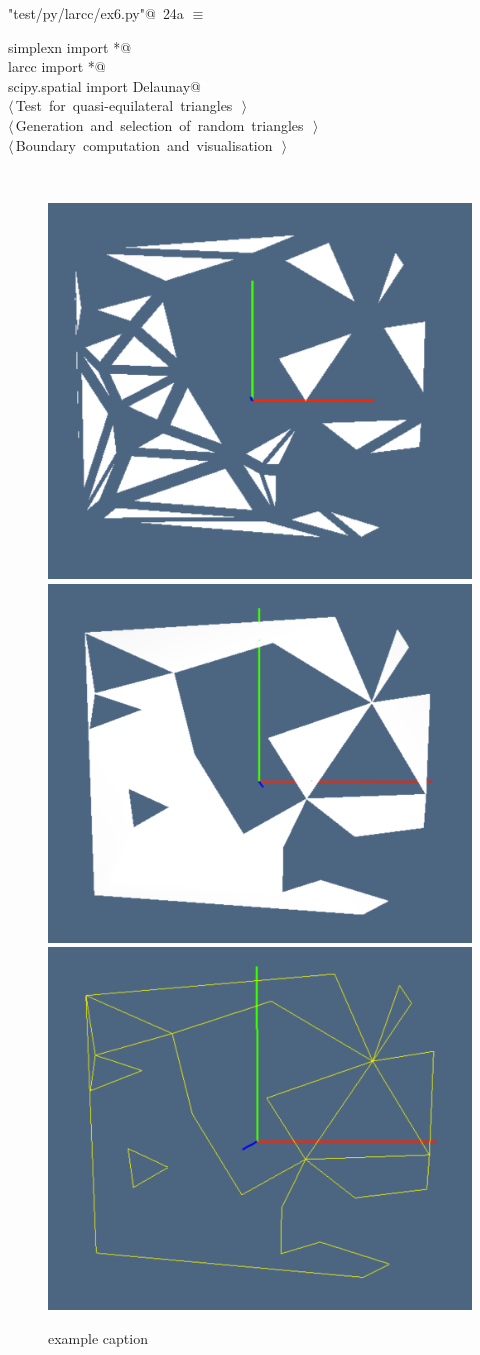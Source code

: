 \documentclass[11pt,oneside]{article}	%
\begin{document}
\begin{flushleft} \small
\begin{minipage}{\linewidth} \label{scrap59}
\protect{}\verb@"test/py/larcc/ex6.py"@\nobreak\ {\footnotesize 24a }$\equiv$
\vspace{-1ex}
\begin{list}{}{} \item
\mbox{}\verb@from simplexn import *@\\
\mbox{}\verb@from larcc import *@\\
\mbox{}\verb@from scipy.spatial import Delaunay@\\
\mbox{}\verb@@\hbox{$\langle\,$Test for quasi-equilateral triangles\nobreak\ {\footnotesize {}}$\,\rangle$}\verb@@\\
\mbox{}\verb@@\hbox{$\langle\,$Generation and selection of random triangles\nobreak\ {\footnotesize {}}$\,\rangle$}\verb@@\\
\mbox{}\verb@@\hbox{$\langle\,$Boundary computation and visualisation\nobreak\ {\footnotesize {}}$\,\rangle$}\verb@@\\
\mbox{}\verb@@{\NWsep}
\end{list}
\vspace{-2ex}
\end{minipage}\\[4ex]
\end{flushleft}


\begin{figure}[htbp] %
   \centering
   \includegraphics[height=0.25\linewidth,width=0.32\linewidth]{images/tria0} 
   \includegraphics[height=0.25\linewidth,width=0.32\linewidth]{images/tria1} 
   \includegraphics[height=0.25\linewidth,width=0.32\linewidth]{images/tria2} 
   \caption{example caption}
   \label{fig:example}
\end{figure}
\end{document}
